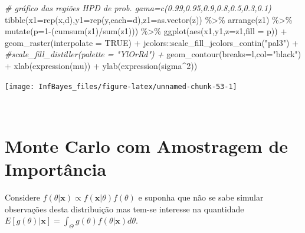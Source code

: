 \documentclass[
]{book}
\newenvironment{Shaded}{\begin{snugshade}}{\end{snugshade}}
\newcommand{\AttributeTok}[1]{\textcolor[rgb]{0.77,0.63,0.00}{#1}}
\newcommand{\CommentTok}[1]{\textcolor[rgb]{0.56,0.35,0.01}{\textit{#1}}}
\newcommand{\ConstantTok}[1]{\textcolor[rgb]{0.00,0.00,0.00}{#1}}
\newcommand{\DecValTok}[1]{\textcolor[rgb]{0.00,0.00,0.81}{#1}}
\newcommand{\FunctionTok}[1]{\textcolor[rgb]{0.00,0.00,0.00}{#1}}
\newcommand{\NormalTok}[1]{#1}
\newcommand{\SpecialCharTok}[1]{\textcolor[rgb]{0.00,0.00,0.00}{#1}}
\newcommand{\StringTok}[1]{\textcolor[rgb]{0.31,0.60,0.02}{#1}}
\begin{document}
\begin{Shaded}
\begin{Highlighting}[]
\CommentTok{\# gráfico das regiões HPD de prob. gama=c(0.99,0.95,0.9,0.8,0.5,0.3,0.1)}
\FunctionTok{tibble}\NormalTok{(}\AttributeTok{x1=}\FunctionTok{rep}\NormalTok{(x,d),}\AttributeTok{y1=}\FunctionTok{rep}\NormalTok{(y,}\AttributeTok{each=}\NormalTok{d),}\AttributeTok{z1=}\FunctionTok{as.vector}\NormalTok{(z)) }\SpecialCharTok{\%\textgreater{}\%}
  \FunctionTok{arrange}\NormalTok{(z1) }\SpecialCharTok{\%\textgreater{}\%} \FunctionTok{mutate}\NormalTok{(}\AttributeTok{p=}\DecValTok{1}\SpecialCharTok{{-}}\NormalTok{(}\FunctionTok{cumsum}\NormalTok{(z1)}\SpecialCharTok{/}\FunctionTok{sum}\NormalTok{(z1))) }\SpecialCharTok{\%\textgreater{}\%} 
  \FunctionTok{ggplot}\NormalTok{(}\FunctionTok{aes}\NormalTok{(x1,y1,}\AttributeTok{z=}\NormalTok{z1,}\AttributeTok{fill =}\NormalTok{ p)) }\SpecialCharTok{+}
  \FunctionTok{geom\_raster}\NormalTok{(}\AttributeTok{interpolate =} \ConstantTok{TRUE}\NormalTok{) }\SpecialCharTok{+}
\NormalTok{  jcolors}\SpecialCharTok{::}\FunctionTok{scale\_fill\_jcolors\_contin}\NormalTok{(}\StringTok{"pal3"}\NormalTok{) }\SpecialCharTok{+}
  \CommentTok{\#scale\_fill\_distiller(palette = "YlOrRd") +}
  \FunctionTok{geom\_contour}\NormalTok{(}\AttributeTok{breaks=}\NormalTok{l,}\AttributeTok{col=}\StringTok{"black"}\NormalTok{) }\SpecialCharTok{+}
  \FunctionTok{xlab}\NormalTok{(}\FunctionTok{expression}\NormalTok{(mu)) }\SpecialCharTok{+} \FunctionTok{ylab}\NormalTok{(}\FunctionTok{expression}\NormalTok{(sigma}\SpecialCharTok{\^{}}\DecValTok{2}\NormalTok{))}
\end{Highlighting}
\end{Shaded}

\begin{center}\texttt{[image: InfBayes\_files/figure-latex/unnamed-chunk-53-1]} \end{center}

\(~\)

\hypertarget{monte-carlo-com-amostragem-de-importuxe2ncia}{%
\section{Monte Carlo com Amostragem de Importância}\label{monte-carlo-com-amostragem-de-importuxe2ncia}}

Considere \(f(\theta|\boldsymbol x)\propto f(\boldsymbol x| \theta)f(\theta)\) e suponha que não se sabe simular observações desta distribuição mas tem-se interesse na quantidade \(E\left[g(\theta)|\boldsymbol x\right]=\displaystyle\int_\Theta g(\theta)f(\theta| \boldsymbol x)d\theta\).
\end{document}
